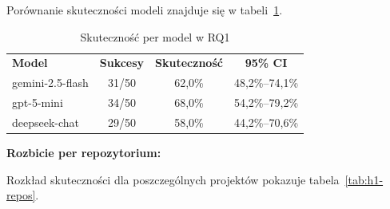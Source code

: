 Porównanie skuteczności modeli znajduje się w tabeli~\ref{tab:h1-models}.

\begin{table}[h]
    \centering
    \begin{tabular}{lccc}
        \textbf{Model} & \textbf{Sukcesy} & \textbf{Skuteczność} & \textbf{95\% CI} \\
        gemini-2.5-flash & 31/50 & 62{,}0\% & 48{,}2\%--74{,}1\% \\
        gpt-5-mini & 34/50 & 68{,}0\% & 54{,}2\%--79{,}2\% \\
        deepseek-chat & 29/50 & 58{,}0\% & 44{,}2\%--70{,}6\% \\
    \end{tabular}
    \caption{Skuteczność per model w RQ1}
    \label{tab:h1-models}
\end{table}

\textbf{Rozbicie per repozytorium:}

Rozkład skuteczności dla poszczególnych projektów pokazuje tabela~\ref{tab:h1-repos}.

